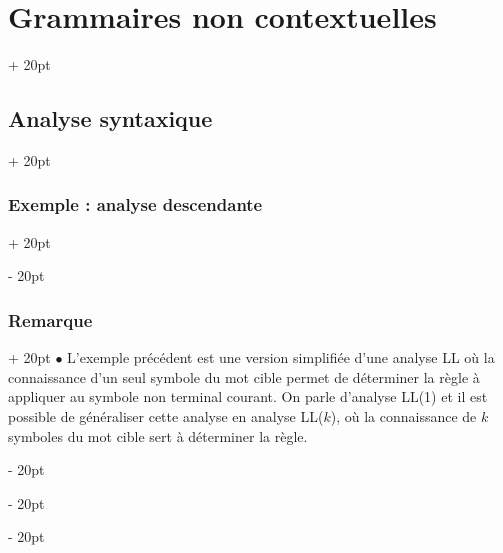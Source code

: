 \documentclass[a4paper, 12pt, twoside]{article}
\newcommand{\ind}[1][20pt]{\advance\leftskip + #1}
\newcommand{\deind}[1][20pt]{\advance\leftskip - #1}
\newenvironment{indt}[2][20pt]{#2 \par \ind[#1]}{\par \deind} %
\begin{document}
\begin{indt}{\section{Grammaires non contextuelles}}
\begin{indt}{\subsection{Analyse syntaxique}}
\begin{indt}{\subsubsection{Exemple : analyse descendante}}
\begin{center}
                \end{center}
            \end{indt}

            \vspace{12pt}
            
            \begin{indt}{\subsubsection{Remarque}}
                $\bullet$ L'exemple précédent est une version simplifiée d'une analyse LL où la connaissance d'un seul symbole du mot cible permet de déterminer la règle à appliquer au symbole non terminal courant.
                On parle d'analyse LL(1) et il est possible de généraliser cette analyse en analyse LL($k$), où la connaissance de $k$ symboles du mot cible sert à déterminer la règle.


\end{indt}
\end{indt}
\end{indt}
\end{document}
